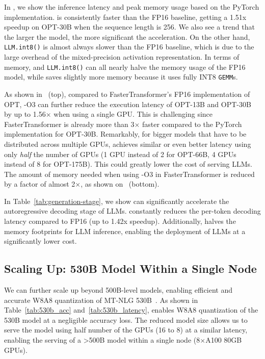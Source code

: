 
In , we show the inference latency and peak memory usage based on the PyTorch implementation. \method is consistently faster than the FP16 baseline, getting a 1.51x speedup on OPT-30B when the sequence length is 256. We also see a trend that the larger the model, the more significant the acceleration. On the other hand, \texttt{LLM.int8()} is almost always slower than the FP16 baseline, which is due to the large overhead of the mixed-precision activation representation. In terms of memory, \method and \texttt{LLM.int8()} can all nearly halve the memory usage of the FP16 model, while \method saves slightly more memory because it uses fully INT8 \texttt{GEMM}s.


As shown in ~(top), compared to FasterTransformer's FP16 implementation of OPT, \method-O3 can further reduce the execution latency of OPT-13B and OPT-30B by up to 1.56$\times$ when using a single GPU.
This is challenging since FasterTransformer is already more than 3$\times$ faster compared to the PyTorch implementation for OPT-30B.
Remarkably, for bigger models that have to be distributed across multiple GPUs, \method achieves similar or even better latency using only \emph{half} the number of GPUs (1 GPU instead of 2 for OPT-66B, 4 GPUs instead of 8 for OPT-175B). This could greatly lower the cost of serving LLMs. The amount of memory needed when using \method-O3 in FasterTransformer is reduced by a factor of almost 2$\times$, as shown on ~(bottom).

In Table~\ref{tab:generation-stage}, we show \method can significantly accelerate the autoregressive decoding stage of LLMs. \method constantly reduces the per-token decoding latency compared to FP16 (up to 1.42x speedup). Additionally, \method halves the memory footprints for LLM inference, enabling the deployment of LLMs at a significantly lower cost.




\subsection{Scaling Up: 530B Model Within a Single Node}
We can further scale up \method beyond 500B-level models, enabling efficient and accurate W8A8 quantization of MT-NLG 530B~\cite{smith2022using}. As shown in Table~\ref{tab:530b_acc} and~\ref{tab:530b_latency}, \method enables W8A8 quantization of the 530B model at a negligible accuracy loss. The reduced model size allows us to serve the model using half number of the GPUs (16 to 8) at a similar latency, enabling the serving of a >500B model within a single node (8$\times$A100 80GB GPUs). 

